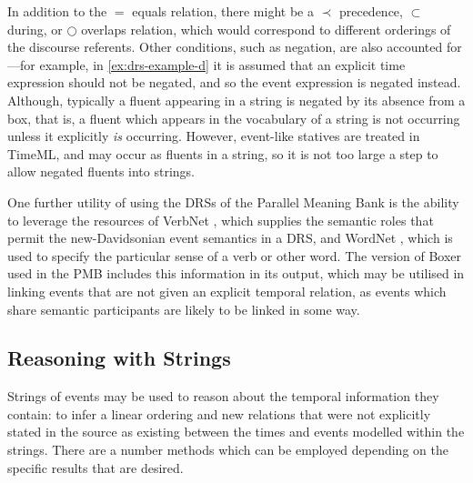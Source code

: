 \documentclass[a4paper,12pt,leqno]{article}
\begin{document}
In addition to the $=$ equals relation, there might be a $\prec$ precedence, $\subset$ during, or $\bigcirc$ overlaps relation, which would correspond to different orderings of the discourse referents. Other conditions, such as negation, are also accounted for---for example, in \cref{ex:drs-example-d} it is assumed that an explicit time expression should not be negated, and so the event expression is negated instead. Although, typically a fluent appearing in a string is negated by its absence from a box, that is, a fluent which appears in the vocabulary of a string is not occurring unless it explicitly \textit{is} occurring. However, event-like statives are treated in TimeML, and may occur as fluents in a string, so it is not too large a step to allow negated fluents into strings.

One further utility of using the DRSs of the Parallel Meaning Bank is the ability to leverage the resources of VerbNet \citep{schuler2005verbnet}, which supplies the semantic roles that permit the new-Davidsonian event semantics in a DRS, and WordNet \citep{fellbaum2010wordnet}, which is used to specify the particular sense of a verb or other word. The version of Boxer used in the PMB includes this information in its output, which may be utilised in linking events that are not given an explicit temporal relation, as events which share semantic participants are likely to be linked in some way.



\subsection{Reasoning with Strings}\label{sub:reasoning}
Strings of events may be used to reason about the temporal information they contain: to infer a linear ordering and new relations that were not explicitly stated in the source as existing between the times and events modelled within the strings. There are a number methods which can be employed depending on the specific results that are desired.
\end{document}
